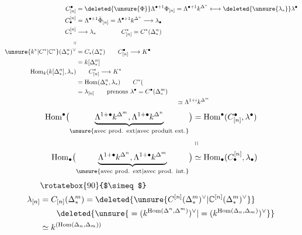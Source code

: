 \[
\begin{aligned}
C^\bullet_{[n]}&=\deleted{\unsure{\Phi}}\Lambda^{\bullet+1}\Phi_{[n]}=\Lambda^{\bullet+1}k^{\Delta^n}\longleftrightarrow\deleted{\unsure{\lambda_*}}\lambda^\bullet\\
C_\bullet^{[n]}&=\Lambda^{\bullet+1}\check\Phi_{[n]}=\Lambda^{\bullet+1}k^{\Delta^n}\longrightarrow\lambda_\bullet\\
C_*^{[n]}&\longrightarrow\lambda_*\qquad\qquad C^*_{[n]}=C^*(\Delta^n_*)\\
\shortparallel\\
\unsure{k^*|C^*|\mathbb C^*}(\Delta^n_*)^\vee&=C_*(\Delta^n_*)\qquad C^\bullet_{[n]}\longrightarrow K^\bullet\\
&=k[\Delta^n_*]\\
\operatorname{Hom}_k(k[\Delta^n_*],\lambda_*)&\qquad C^*_{[n]}\longrightarrow K^*\\
&=\operatorname{Hom}(\Delta^n_*,\lambda_*)\qquad C^*(\\
&=\lambda_{[n]}\qquad\text{prenons }\lambda^\bullet=C^\bullet(\Delta^m_*)\\
&\hspace{16em}\simeq\Lambda^{1+i}k^{\Delta^m}
\end{aligned}
\]
\[
\begin{aligned}
\operatorname{Hom}^\bullet\bigl(\underbrace{\Lambda^{1+\bullet}k^{\Delta^m},\Lambda^{1+\bullet}k^{\Delta^n}}_{\text{\unsure{avec prod. ext|avec produit ext.}}}\bigr)
 &=\operatorname{Hom}^\bullet(C^\bullet_{[n]},\lambda^\bullet)\\
 &\shortparallel\\
\operatorname{Hom}_\bullet\bigl(\underbrace{\Lambda^{1+\bullet}k^{\Delta^n},\Lambda^{1+\bullet}k^{\Delta^m}}_{\text{\unsure{avec prod. ext|avec prod. int.}}}\bigr)
 &\simeq\operatorname{Hom}_\bullet(C_\bullet^{[n]},\lambda_\bullet)
\end{aligned}
\]
\[
\begin{aligned}
&\rotatebox{90}{$\simeq$}\\
\lambda_{[n]}&=C_{[n]}(\Delta^m_*)=\deleted{\unsure{C^{[n]}(\Delta^m_*)^\vee|\mathbb C^{[n]}(\Delta^m_*)^\vee}}\\
&\qquad\deleted{\unsure{{}=(k^{\operatorname{Hom}(\Delta^n,\Delta^m)})^\vee|{}=(k^{\operatorname{Hom}(\Delta_n,\Delta_m)})^\vee}}\\
&\simeq k^{(\operatorname{Hom}(\Delta_n,\Delta_m))}
\end{aligned}
\]
